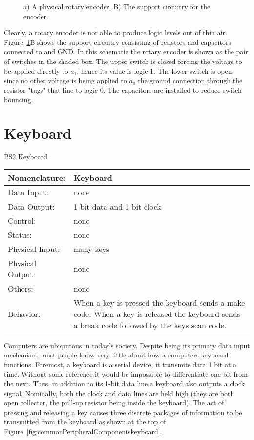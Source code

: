 \begin{figure}[ht]
\caption{a) A physical rotary encoder.  B) The support circuitry for
the encoder.}
\label{fig:commonPeripheralComponentsencoder}
\end{figure}

Clearly, a rotary encoder is not able to produce logic levels out 
of thin air.   Figure~\ref{fig:commonPeripheralComponentsencoder}B shows the support 
circuitry consisting of resistors and capacitors connected to 
\VCC and GND.  In this schematic the rotary encoder is shown as the
pair of switches in the shaded box.  The upper switch is closed
forcing the voltage \VCC to be applied directly to $a_1$, hence its
value is logic 1.  The lower switch is open, since no other voltage 
is being applied to $a_0$ the ground connection through the resistor 
"tugs" that line to logic 0.  The capacitors are installed to reduce 
switch bouncing.

\section{Keyboard}
\label{page:keyboad}
\begin{buildingblock}{PS2 Keyboard}
\begin{tabular}{|l|p{3.5in}|} \hline
Nomenclature:  & Keyboard                           \\ \hline
Data Input:    & none        \\ \hline
Data Output:   & 1-bit data and 1-bit clock   \\ \hline
Control:       & none           \\ \hline
Status:        & none                                   \\ \hline
Physical Input:& many keys		\\ \hline
Physical Output:& none		\\ \hline
Others:        & none                   \\ \hline
Behavior:      & When a key is pressed the keyboard sends a make code.
When a key is released the keyboard sends a break code followed by the
keys scan code. \\ \hline
\end{tabular}
\end{buildingblock}

Computers are ubiquitous in today's society.  Despite being its primary 
data input mechanism, most people know very little about how a computers
keyboard functions.  Foremost, a keyboard is a serial device, it transmits
data 1 bit at a time.  Without some reference it would be impossible
to differentiate one bit from the next.  Thus, in addition to its 1-bit
data line a keyboard also outputs a clock signal.  Nominally, both the
clock and data lines are held high (they are both open collector, the 
pull-up resistor being inside the keyboard).  The act of pressing and releasing 
a key causes three discrete packages of information to be transmitted from
the keyboard as shown at the top of Figure~\ref{fig:commonPeripheralComponentskeyboard}.

